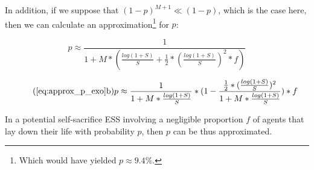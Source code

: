  In addition, if we suppose that $(1-p)^{M+1} \ll (1-p)$, which is the case here, then we
 can calculate an approximation\footnote{Which would have yielded
 $p \approx 9.4\%$.} for $p$:

 \[p \approx \frac{1}{1+M*(\frac{log(1+S)}{S} + \frac{1}{2}*(\frac{log(1+S)}{S})^2*f)}\]


 \begin{equation}
    \tag{\ref{eq:approx_p_exo}b}
    p \approx \frac{1}{1+M*\frac{log(1+S)}{S}}*
    (1- \frac{\frac{1}{2}*
    (\frac{log(1+S)}{S})^2}{1+M*\frac{log(1+S)}{S}})*f
    \label{eq:p_grr_approx}
    \end{equation}



 In a potential self-sacrifice ESS involving a negligible proportion $f$ of agents that lay down their
 life with probability $p$, then $p$ can be thus approximated.

